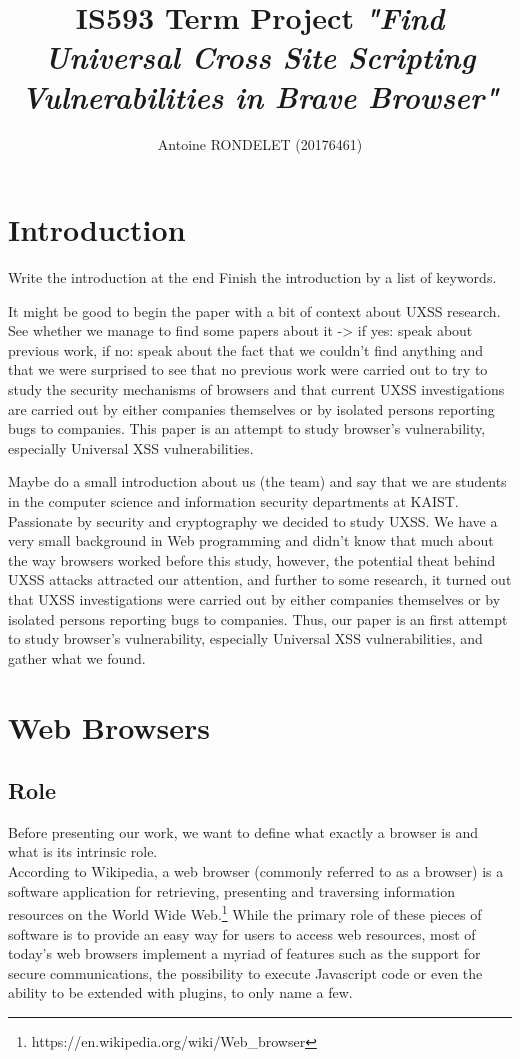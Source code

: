 \documentclass[journal]{IEEEtran}
\begin{document}
\title{IS593 Term Project \emph{"Find Universal Cross Site Scripting Vulnerabilities in Brave Browser"}}

\author{Antoine RONDELET (20176461)}
\maketitle
\IEEEpeerreviewmaketitle

\section{Introduction}
Write the introduction at the end
Finish the introduction by a list of keywords.

It might be good to begin the paper with a bit of context about UXSS research. See whether we manage to find some papers about it -> if yes: speak about previous work, if no: speak about the fact that we couldn't find anything and that we were surprised to see that no previous work were carried out to try to study the security mechanisms of browsers and that current UXSS investigations are carried out by either companies themselves or by isolated persons reporting bugs to companies. This paper is an attempt to study browser's vulnerability, especially Universal XSS vulnerabilities.

Maybe do a small introduction about us (the team) and say that we are students in the computer science and information security departments at KAIST. Passionate by security and cryptography we decided to study UXSS. We have a very small background in Web programming and didn't know that much about the way browsers worked before this study, however, the potential theat behind UXSS attacks attracted our attention, and further to some research, it turned out that UXSS investigations were carried out by either companies themselves or by isolated persons reporting bugs to companies. Thus, our paper is an first attempt to study browser's vulnerability, especially Universal XSS vulnerabilities, and gather what we found. 

\section{Web Browsers}

\subsection{Role}
Before presenting our work, we want to define what exactly a browser is and what is its intrinsic role. \\
According to Wikipedia, a web browser (commonly referred to as a browser) is a software application for retrieving, presenting and traversing information resources on the World Wide Web.\footnote{https://en.wikipedia.org/wiki/Web\_browser} 
While the primary role of these pieces of software is to provide an easy way for users to access web resources, most of today's web browsers implement a myriad of features such as the support for secure communications, the possibility to execute Javascript code or even the ability to be extended with plugins, to only name a few.
\end{document}
